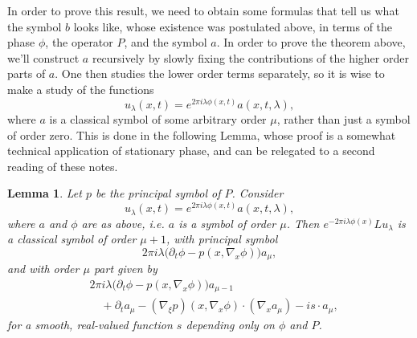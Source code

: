 \documentclass{article}
\theoremstyle{plain}
\newtheorem{lemma}[theorem]{Lemma}
\theoremstyle{remark}
\theoremstyle{definition}
\begin{document}
In order to prove this result, we need to obtain some formulas that tell us what the symbol $b$ looks like, whose existence was postulated above, in terms of the phase $\phi$, the operator $P$, and the symbol $a$. In order to prove the theorem above, we'll construct $a$ recursively by slowly fixing the contributions of the higher order parts of $a$. One then studies the lower order terms separately, so it is wise to make a study of the functions
%
\[ u_\lambda(x,t) = e^{2 \pi i \lambda \phi(x,t)} a(x,t,\lambda),\]
%
where $a$ is a classical symbol of some arbitrary order $\mu$, rather than just a symbol of order zero. This is done in the following Lemma, whose proof is a somewhat technical application of stationary phase, and can be relegated to a second reading of these notes.

\begin{lemma}
	Let $p$ be the principal symbol of $P$. Consider
	\[ u_\lambda(x,t) = e^{2 \pi i \lambda \phi(x,t)} a(x,t,\lambda), \]
	where $a$ and $\phi$ are as above, i.e. $a$ is a symbol of order $\mu$. Then $e^{-2 \pi i \lambda \phi(x)} L u_\lambda$ is a classical symbol of order $\mu+1$, with principal symbol
	\[ 2\pi i \lambda \Big( \partial_t \phi - p \left( x, \nabla_x \phi \right) \Big) a_\mu, \]
	and with order $\mu$ part given by
	\begin{align*}
		&2 \pi i \lambda \Big( \partial_t \phi - p \left( x, \nabla_x \phi \right) \Big) a_{\mu - 1}\\
		&\quad + \partial_t a_\mu -  (\nabla_\xi p)(x, \nabla_x \phi) \cdot (\nabla_x a_\mu) - i s \cdot a_\mu,
	\end{align*}
	for a smooth, real-valued function $s$ depending only on $\phi$ and $P$.
\end{lemma}
\end{document}

